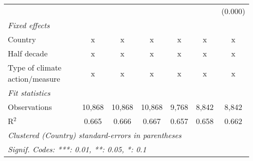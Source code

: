 \begin{tabular}{lcccccc}
                                                   &         &               &                &                &                & (0.000)\\   
   \emph{Fixed effects}\\
   Country                                         & x       & x             & x              & x              & x              & x\\  
   Half decade                                     & x       & x             & x              & x              & x              & x\\  
   Type of climate action/measure                  & x       & x             & x              & x              & x              & x\\  
   \midrule \emph{Fit statistics}\\
   Observations                                    & 10,868  & 10,868        & 10,868         & 9,768          & 8,842          & 8,842\\  
   R$^2$                                           & 0.665   & 0.666         & 0.667          & 0.657          & 0.658          & 0.662\\  
   \midrule
   \multicolumn{7}{l}{\emph{Clustered (Country) standard-errors in parentheses}}\\
   \multicolumn{7}{l}{\emph{Signif. Codes: ***: 0.01, **: 0.05, *: 0.1}}\\
\end{tabular}
\par\endgroup


